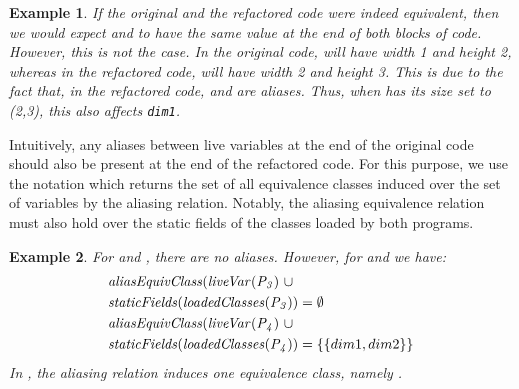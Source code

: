 \documentclass[conference]{IEEEtran}
\newtheorem{example}{Example}
\begin{document}
\begin{example}
If the original and the refactored code were indeed equivalent,
then we would expect  and  to have the same value at the end of both blocks of code. 
However, this is not the case.
In the original code,  will have width 1 and height 2, whereas in the refactored code,
 will have width 2 and height 3. This is due to the fact that,
in the refactored code,  and  are aliases. %
Thus, when  has its size set to (2,3), this also affects \lstinline[breaklines=true]{dim1}.
\end{example}  

Intuitively, any aliases between live variables at the end of the original code should also
be present at the end of the refactored code. For this purpose, we use the notation
 which returns the set of all equivalence classes induced over the
set of variables  by the aliasing relation.  
Notably, the aliasing equivalence relation must also hold over the
static fields of the classes loaded by both programs.


\begin{example}
For  and , there are no aliases. 
%
However, for  and  we have:
\[
\begin{aligned}[t]
  &\mathit{{aliasEquivClass(liveVar(P_3)}}~ \cup\\
  &\mathit{{staticFields(loadedClasses(P_3))}} = \emptyset\\
  &\mathit{{aliasEquivClass(liveVar(P_4)}} ~\cup\\
  &\mathit{{staticFields(loadedClasses(P_4))}} = \{\{dim1, dim2\}\} 
\end{aligned}
\]
In , the aliasing relation induces one equivalence class, namely .

\end{example}
  
\end{document}
